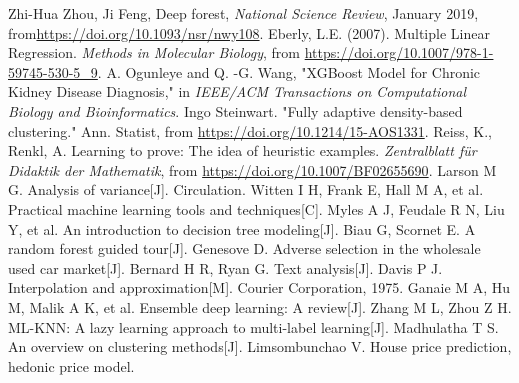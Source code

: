 \documentclass[12pt]{article}  %
\begin{document}
\begin{thebibliography}{99}
 Zhi-Hua Zhou, Ji Feng, Deep forest, \emph{National Science Review}, January 2019, from\url{https://doi.org/10.1093/nsr/nwy108}.
 Eberly, L.E. (2007). Multiple Linear Regression. \emph{Methods in Molecular Biology}, from \url{https://doi.org/10.1007/978-1-59745-530-5_9}.
 A. Ogunleye and Q. -G. Wang, "XGBoost Model for Chronic Kidney Disease Diagnosis," in \emph{IEEE/ACM Transactions on Computational Biology and Bioinformatics}.
 Ingo Steinwart. "Fully adaptive density-based clustering." Ann. Statist, from \url{https://doi.org/10.1214/15-AOS1331}.
 Reiss, K., Renkl, A. Learning to prove: The idea of heuristic examples. \emph{Zentralblatt für Didaktik der Mathematik}, from \url{https://doi.org/10.1007/BF02655690}.
 Larson M G. Analysis of variance[J]. Circulation.
 Witten I H, Frank E, Hall M A, et al. Practical machine learning tools and techniques[C].
 Myles A J, Feudale R N, Liu Y, et al. An introduction to decision tree modeling[J].
 Biau G, Scornet E. A random forest guided tour[J].
 Genesove D. Adverse selection in the wholesale used car market[J].
 Bernard H R, Ryan G. Text analysis[J]. 
 Davis P J. Interpolation and approximation[M]. Courier Corporation, 1975.
 Ganaie M A, Hu M, Malik A K, et al. Ensemble deep learning: A review[J].
 Zhang M L, Zhou Z H. ML-KNN: A lazy learning approach to multi-label learning[J].
 Madhulatha T S. An overview on clustering methods[J].
 Limsombunchao V. House price prediction, hedonic price model.
\end{thebibliography}
\end{document}
